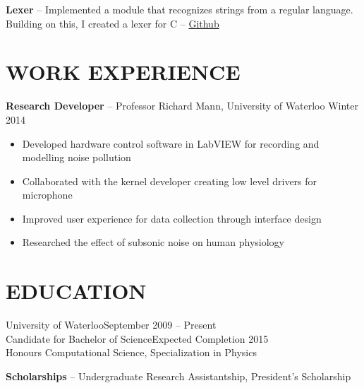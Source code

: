 \documentclass{res}
\begin{document}
\begin{resume}
    {\bf Lexer} -- Implemented a module that recognizes strings from a regular language.\\
    \hspace*{13mm}  Building on this, I created a lexer for C --
    \href{https://www.github.com/joelwilliamson/ndfa}{Github}

    
    
 
\section{WORK EXPERIENCE}
  \vspace{3mm}
    {\bf Research Developer} -- Professor Richard Mann, University of Waterloo	\hfill Winter 2014\\
    \vspace{-2mm}
   \begin{itemize}
    \item Developed hardware control software in LabVIEW for recording and modelling noise pollution
    \item Collaborated with the kernel developer creating low level drivers for microphone
    \item Improved user experience for data collection through interface design
    \item Researched the effect of subsonic noise on human physiology
    
   \end{itemize}

   
\section{EDUCATION}          
  \vspace{3mm}
    University of Waterloo\hfill September 2009 -- Present\\
    Candidate for Bachelor of Science\hfill Expected Completion 2015\\
    Honours Computational Science, Specialization in Physics
    \vspace{-3mm}
    
    {\bf Scholarships} -- Undergraduate Research Assistantship, President's Scholarship
    \vspace{-3mm}
    

\end{resume}
\end{document}
